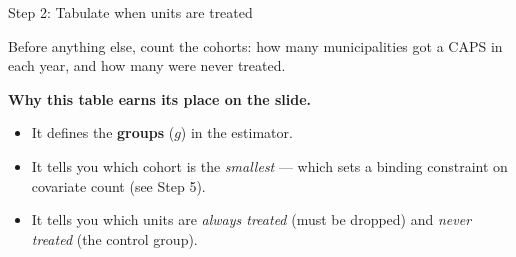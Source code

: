 \documentclass[aspectratio=169,12pt,t]{beamer}
\begin{document}

\begin{frame}{Step 2: Tabulate when units are treated}
\vspace{0.6cm}

Before anything else, count the cohorts: \;how many municipalities got a CAPS in each year, and how many were never treated.

\vspace{0.5cm}

\textbf{Why this table earns its place on the slide.}
\begin{itemize}\small
  \item It defines the \textbf{groups} ($g$) in the estimator.
  \item It tells you which cohort is the \textit{smallest} --- which sets a binding constraint on covariate count (see Step 5).
  \item It tells you which units are \textit{always treated} (must be dropped) and \textit{never treated} (the control group).
\end{itemize}

\vspace{0.4em}
\end{frame}
\end{document}
